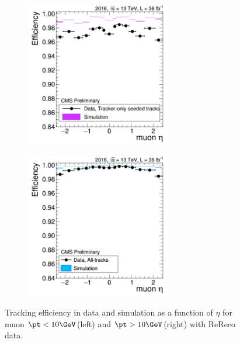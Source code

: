 \begin{figure}[tbh]
\centering
\begin{subfigure}{0.45\textwidth}
\centering
\includegraphics[width=2.5in]{Figures/Muons/trackingEffptl10.pdf}
\caption{}
\end{subfigure}
\begin{subfigure}{0.45\textwidth}
\centering
\includegraphics[width=2.5in]{Figures/Muons/trackingEffptg10.pdf}
\caption{}
\end{subfigure}
    \caption{Tracking efficiency in data and simulation as a function of $\eta$ for muon $\pt < 10\GeV$(left) and $\pt > 10\GeV$(right) with ReReco data.}
    \label{fig:MuonIDEff_4}
\end{figure}



